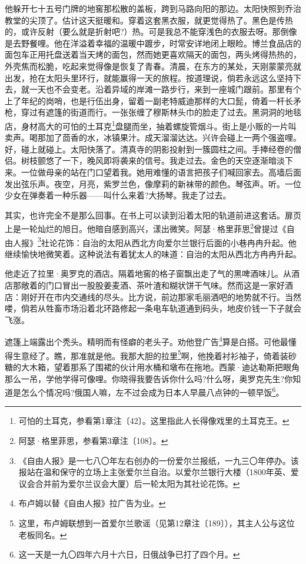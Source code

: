 \par 他躲开七十五号门牌的地窖那松散的盖板，跨到马路向阳的那边。太阳快照到乔治教堂的尖顶了。估计这天挺暖和。穿着这套黑衣服，就更觉得热了。黑色是传热的，或许反射（要么就是折射吧?）热。可是我总不能穿浅色的衣服去呀。那倒像是去野餐哩。他在洋溢着幸福的温暖中踱步，时常安详地闭上眼睑。博兰食品店的面包车正用托盘送着当天烤的面包，然而她更喜欢隔天的面包，两头烤得热热的，外壳焦而松脆，吃起来觉得像是恢复了青春。清晨，在东方的某处，天刚蒙蒙亮就出发，抢在太阳头里环行，就能赢得一天的旅程。按道理说，倘若永远这么坚持下去，就一天也不会变老。沿着异域的岸滩一路步行，来到一座城门跟前。那里有个上了年纪的岗哨，也是行伍出身，留着一副老特威迪那样的大口髭，倚着一杆长矛枪，穿过有遮篷的街道而行。一张张缠了穆斯林头巾的脸走了过去。黑洞洞的地毯店，身材高大的可怕的土耳克\footnote{可怕的土耳克，参看第1章注〔42〕。这里指此人长得像戏里的土耳克王。}盘腿而坐，抽着螺旋管烟斗。街上是小贩的一片叫卖声。喝那加了茴香的水，冰镇果汁。成天溜溜达达。兴许会碰上一两个强盗哩。好，碰上就碰上。太阳快落了。清真寺的阴影投射到一簇圆柱之间。手捧经卷的僧侣。树枝颤悠了一下，晚风即将袭来的信号。我走过去。金色的天空逐渐暗淡下来。一位做母亲的站在门口望着我。她用难懂的语言把孩子们喊回家去。高墙后面发出弦乐声。夜空，月亮，紫罗兰色，像摩莉的新袜带的颜色。琴弦声。听。一位少女在弹奏着一种乐器——叫什么来着?大扬琴。我走了过去。
\par 其实，也许完全不是那么回事。在书上可以读到沿着太阳的轨道前进这套话。扉页上是一轮灿烂的旭日。他暗自感到高兴，漾出微笑。阿瑟·格里菲思\footnote{阿瑟·格里菲思，参看第3章注〔108〕。}曾提过《自由人报》\footnote{《自由人报》是一七八〇年左右创办的一份爱尔兰报纸，一九三〇年停办。该报站在温和保守的立场上主张爱尔兰自治。以爱尔兰银行大楼（1800年英、爱议会合并前为爱尔兰议会大厦）后一轮太阳为其社论花饰。}社论花饰：自治的太阳从西北方向爱尔兰银行后面的小巷冉冉升起。他继续愉快地微笑着。这种说法有着犹太人的味道：自治的太阳从西北方冉冉升起。
\par 他走近了拉里·奥罗克的酒店。隔着地窖的格子窗飘出走了气的黑啤酒味儿。从酒店那敞着的门口冒出一股股姜麦酒、茶叶渣和糊状饼干气味。然而这是一家好酒店：刚好开在市内交通线的尽头。比方说，前边那家毛丽酒吧的地势就不行。当然喽，倘若从牲畜市场沿着北环路修起一条电车轨道通到码头，地皮价钱一下子就会飞涨。
\par 遮篷上端露出个秃头。精明而有怪癖的老头子。劝他登广告\footnote{布卢姆以替《自由人报》拉广告为业。}算是白搭。可他最懂得生意经了。瞧，那准就是他。我那大胆的拉里\footnote{这里，布卢姆联想到一首爱尔兰歌谣（见第12章注〔189〕），其主人公与这位老板同名。}啊，他挽着衬衫袖子，倚着装砂糖的大木箱，望着那系了围裙的伙计用水桶和墩布在拖地。西蒙·迪达勒斯把眼角那么一吊，学他学得可像哩。你晓得我要告诉你什么吗?什么呀，奥罗克先生?你知道是怎么个情况吗?俄国人嘛，左不过会成为日本人早晨八点钟的一顿早饭\footnote{这一天是一九〇四年六月十六日，日俄战争已打了四个月。}。
